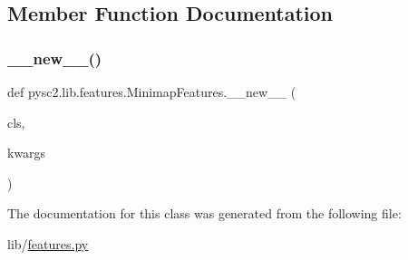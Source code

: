 \subsection{Member Function Documentation}
\mbox{\label{classpysc2_1_1lib_1_1features_1_1_minimap_features_a1f02bf52fac52f980a4f09afbbe34731}} 
\subsubsection{\texorpdfstring{\+\_\+\+\_\+new\+\_\+\+\_\+()}{\_\_new\_\_()}}
{\footnotesize\ttfamily def pysc2.\+lib.\+features.\+Minimap\+Features.\+\_\+\+\_\+new\+\_\+\+\_\+ (\begin{DoxyParamCaption}\item[{}]{cls,  }\item[{}]{kwargs }\end{DoxyParamCaption})}



The documentation for this class was generated from the following file\+:\begin{DoxyCompactItemize}
\item 
lib/\mbox{\hyperlink{features_8py}{features.\+py}}\end{DoxyCompactItemize}
